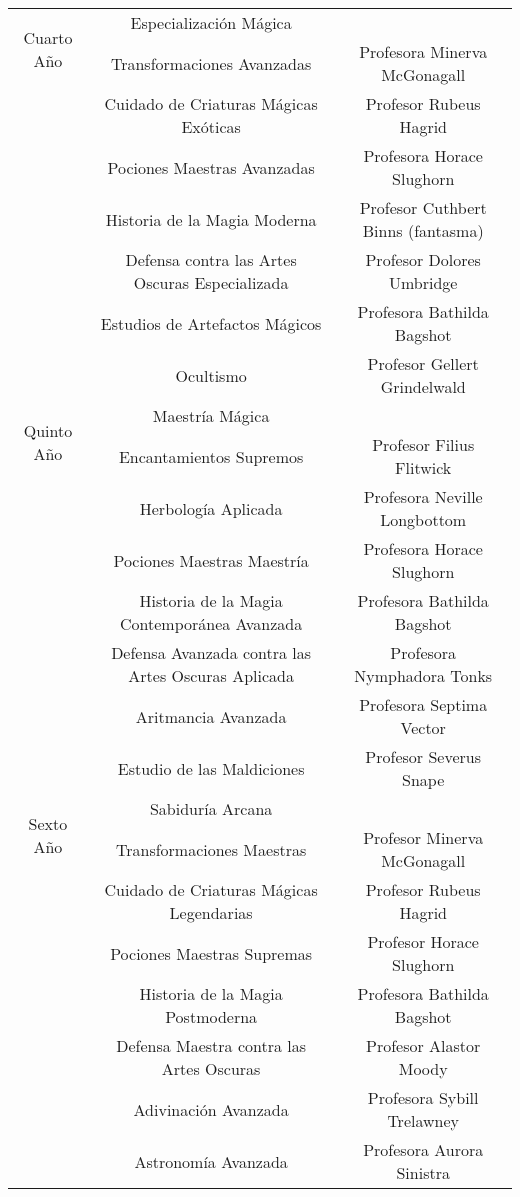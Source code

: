 \begin{table}[H]
\begin{tabular}{c|c|c}
  \multirow{2}{*}{Cuarto Año} & Especialización Mágica & \\
  & Transformaciones Avanzadas & Profesora Minerva McGonagall \\
  & Cuidado de Criaturas Mágicas Exóticas & Profesor Rubeus Hagrid \\
  & Pociones Maestras Avanzadas & Profesora Horace Slughorn \\
  & Historia de la Magia Moderna & Profesor Cuthbert Binns (fantasma) \\
  & Defensa contra las Artes Oscuras Especializada & Profesor Dolores Umbridge \\
  & Estudios de Artefactos Mágicos & Profesora Bathilda Bagshot \\
  & Ocultismo & Profesor Gellert Grindelwald \\ \hline
  \multirow{2}{*}{Quinto Año} & Maestría Mágica & \\
  & Encantamientos Supremos & Profesor Filius Flitwick \\
  & Herbología Aplicada & Profesora Neville Longbottom \\
  & Pociones Maestras Maestría & Profesora Horace Slughorn \\
  & Historia de la Magia Contemporánea Avanzada & Profesora Bathilda Bagshot \\
  & Defensa Avanzada contra las Artes Oscuras Aplicada & Profesora Nymphadora Tonks \\
  & Aritmancia Avanzada & Profesora Septima Vector \\
  & Estudio de las Maldiciones & Profesor Severus Snape \\ \hline
  \multirow{2}{*}{Sexto Año} & Sabiduría Arcana & \\
  & Transformaciones Maestras & Profesor Minerva McGonagall \\
  & Cuidado de Criaturas Mágicas Legendarias & Profesor Rubeus Hagrid \\
  & Pociones Maestras Supremas & Profesor Horace Slughorn \\
  & Historia de la Magia Postmoderna & Profesora Bathilda Bagshot \\
  & Defensa Maestra contra las Artes Oscuras & Profesor Alastor Moody \\
  & Adivinación Avanzada & Profesora Sybill Trelawney \\
  & Astronomía Avanzada & Profesora Aurora Sinistra
  \end{tabular}
  \end{table}
  
